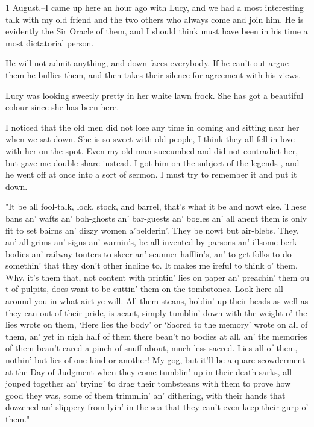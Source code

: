 1 August.--I came up here an hour ago with Lucy, and we had a most interesting talk with my old friend and the two others who always come and join him. He is evidently the Sir Oracle of them, and I should think must have been in his time a most dictatorial person. 

He will not admit anything, and down faces everybody. If he can't out-argue them he bullies them, and then takes their silence for agreement with his views. 

Lucy was looking sweetly pretty in her white lawn frock. She has got a beautiful colour since she has been here. 

I noticed that the old men did not lose any time in coming and sitting near her when we sat down. She is so sweet with old people, I think they all fell in love with her on the spot. Even my old man succumbed and did not contradict her, but gave me double share instead. I got him on the subject of the legends , and he went off at once into a sort of sermon. I must try to remember it and put it down. 

"It be all fool-talk, lock, stock, and barrel, that's what it be and nowt else. These bans an' wafts an' boh-ghosts an' bar-guests an' bogles an' all anent them is only fit to set bairns an' dizzy women a'belderin'. They be nowt but air-blebs. They, an' all grims an' signs an' warnin's, be all invented by parsons an' illsome berk-bodies an' railway touters to skeer an' scunner hafflin's, an' to get folks to do somethin' that they don't other incline to. It makes me ireful to think o' them. Why, it's them that, not content with printin' lies on paper an' preachin' them ou t of pulpits, does want to be cuttin' them on the tombstones. Look here all around you in what airt ye will. All them steans, holdin' up their heads as well as they can out of their pride, is acant, simply tumblin' down with the weight o' the lies wrote on them, `Here lies the body' or `Sacred to the memory' wrote on all of them, an' yet in nigh half of them there bean't no bodies at all, an' the memories of them bean't cared a pinch of snuff about, much less sacred. Lies all of them, nothin' but lies of one kind or another! My gog, but it'll be a quare scowderment at the Day of Judgment when they come tumblin' up in their death-sarks, all jouped together an' trying' to drag their tombsteans with them to prove how good they was, some of them trimmlin' an' dithering, with their hands that dozzened an' slippery from lyin' in the sea that they can't even keep their gurp o' them." 

